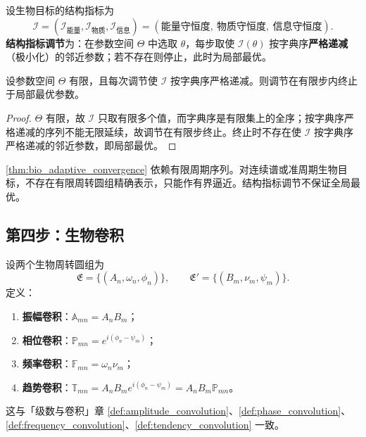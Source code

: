 \begin{definition}[结构指标调节]\label{def:bio_structure_metric_adjustment}
设生物目标的结构指标为
\[
\mathcal I=(\mathcal I_{\text{能量}},\mathcal I_{\text{物质}},\mathcal I_{\text{信息}})
=(\text{能量守恒度},\ \text{物质守恒度},\ \text{信息守恒度}).
\]
\textbf{结构指标调节}为：在参数空间 $\Theta$ 中选取 $\theta$，每步取使 $\mathcal I(\theta)$ 按字典序\textbf{严格递减}（极小化）的邻近参数；若不存在则停止，此时为局部最优。
\end{definition}

\begin{proposition}[结构指标调节的有限收敛]\label{prop:bio_structure_metric_convergence}
设参数空间 $\Theta$ 有限，且每次调节使 $\mathcal I$ 按字典序严格递减。则调节在有限步内终止于局部最优参数。
\end{proposition}

\begin{proof}
$\Theta$ 有限，故 $\mathcal I$ 只取有限多个值，而字典序是有限集上的全序；按字典序严格递减的序列不能无限延续，故调节在有限步终止。终止时不存在使 $\mathcal I$ 按字典序严格递减的邻近参数，即局部最优。
\end{proof}

\begin{remark}[动态调节的边界]\label{rem:bio_adaptive_boundary}
\cref{thm:bio_adaptive_convergence} 依赖有限周期序列。对连续谱或准周期生物目标，不存在有限周转圆组精确表示，只能作有界逼近。结构指标调节不保证全局最优。
\end{remark}

\subsection{第四步：生物卷积}

\begin{definition}\label{def:bio_convolution_types}
设两个生物周转圆组为
\[
\mathfrak E=\{(A_n,\omega_n,\phi_n)\},\qquad
\mathfrak E'=\{(B_m,\nu_m,\psi_m)\}.
\]
定义：
\begin{enumerate}[label=(\roman*)]
    \item \textbf{振幅卷积}：$\mathbb A_{mn}=A_nB_m$；
    \item \textbf{相位卷积}：$\mathbb P_{mn}=e^{i(\phi_n-\psi_m)}$；
    \item \textbf{频率卷积}：$\mathbb F_{mn}=\omega_n\nu_m$；
    \item \textbf{趋势卷积}：$\mathbb T_{mn}=A_nB_m e^{i(\phi_n-\psi_m)}=A_nB_m\mathbb P_{mn}$。
\end{enumerate}
这与「级数与卷积」章 \cref{def:amplitude_convolution}、\cref{def:phase_convolution}、\cref{def:frequency_convolution}、\cref{def:tendency_convolution} 一致。
\end{definition}

